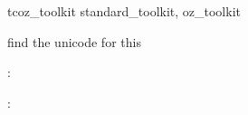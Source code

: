 \begin{zsection}
  \SECTION tcoz\_toolkit \parents standard\_toolkit, oz\_toolkit
\end{zsection}










 find the unicode for this






\begin{axdef}
  \time : \power \arithmos
\end{axdef}

\begin{axdef}
  \delta : \time
\end{axdef}

